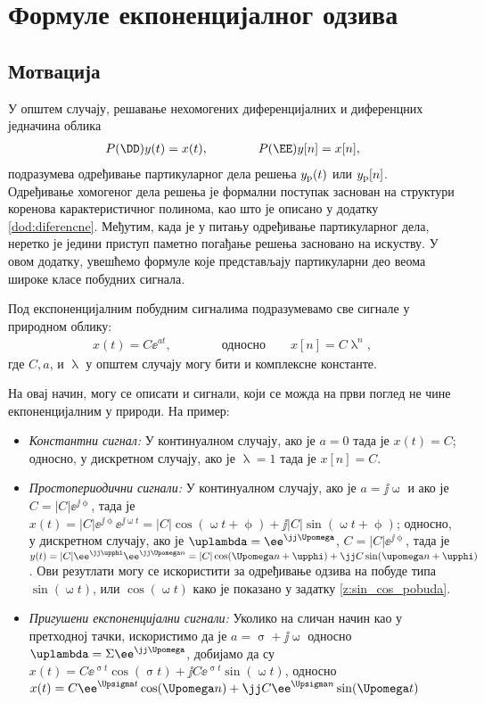 \chapter{Формуле екпоненцијалног одзива} \label{dod:exp_response}

\section*{Мотвација}

У општем случају, решавање нехомогених диференцијалних и диференцних једначина облика 
\begin{eqnarray}
    P(\DD) y(t) = x(t), \qquad\qquad P(\EE)y[n] = x[n],
\end{eqnarray}
подразумева одређивање партикуларног дела решења $y_{\rm p}(t)$ или $y_{\rm p}[n]$. 
Одређивање хомогеног дела решења је формални поступак заснован на структури  коренова карактеристичног полинома, као што је описано
у додатку \ref{dod:diferencne}. Међутим, када је у питању одређивање партикуларног дела, неретко је једини приступ паметно погађање
решења засновано на искуству. У овом додатку, увешћемо формуле које представљају партикуларни део веома широке класе побудних сигнала. 

Под експоненцијалним побудним сигналима подразумевамо све сигнале у природном облику:
\begin{eqnarray}
    x(t) = C \ee^{at}, \qquad\qquad \text{односно}  \quad\quad x[n] = C \uplambda^n,
\end{eqnarray}
где $C, a$, и $\uplambda$ у општем случају могу бити и комплексне константе. 

На овај начин, могу се описати и сигнали, који се можда на први поглед не чине екпоненцијалним у природи. На пример:
\begin{itemize}
    \item \emph{Константни сигнал:} У континуалном случају, ако је $a = 0$ тада је $x(t) = C$; односно, у дискретном случају, 
    ако је $\uplambda = 1$ тада је $x[n] = C$.
    \item \emph{Простопериодични сигнали:} У континуалном случају, ако је $a = \jj\upomega$ и ако је 
    $C = |C| \ee^{\jj\upphi}$, тада је 
    $x(t) = |C| \ee^{\jj\upphi} \ee^{\jj\upomega t} = |C|\cos(\upomega t + \upphi) + \jj |C| \sin(\upomega t + \upphi)$; односно, у дискретном случају, 
    ако је $\uplambda = \ee^{\jj\Upomega}$,  $C = |C| \ee^{\jj\upphi}$, тада је $y(t) =
    |C| \ee^{\jj\upphi} \ee^{\jj\Upomega n} = |C|\cos(\Upomega n + \upphi) + \jj C \sin(\upomega n + \upphi)$.
    Ови резутлати могу се искористити за одређивање одзива на побуде типа $\sin(\upomega t)$, или 
    $\cos(\upomega t)$ како је показано у задатку \ref{z:sin_cos_pobuda}.
    \item \emph{Пригушени експоненцијални сигнали:} Уколико на сличан начин као у претходној тачки, искористимо да је 
    $a = \upsigma + \jj\upomega$ односно $\uplambda = \Sigma \ee^{\jj\Upomega}$, добијамо да су 
    $x(t) = C\ee^{\upsigma t}\cos(\upsigma t)+ \jj C\ee^{\upsigma t}\sin(\upomega t)$, односно
    $x(t) = C\ee^{\Upsigma t}\cos(\Upomega n)+ \jj C\ee^{\Upsigma n}\sin(\Upomega t)$
\end{itemize}

